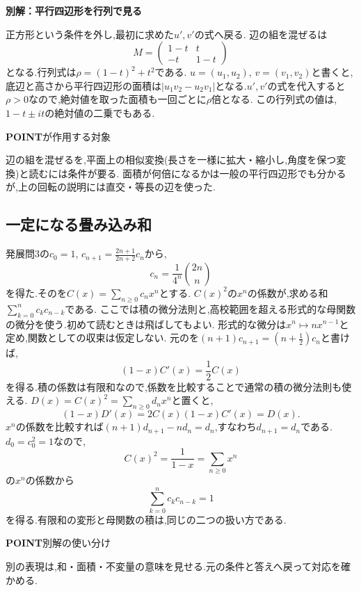 \par\medskip\noindent\textbf{別解：平行四辺形を行列で見る}\par\nobreak\smallskip
正方形という条件を外し,最初に求めた$u',v'$の式へ戻る.
辺の組を混ぜるは
\[
  M=\begin{pmatrix}1-t&t\\-t&1-t\end{pmatrix}
\]
となる.行列式は$\rho=(1-t)^2+t^2$である.
$u=(u_1,u_2)$, $v=(v_1,v_2)$と書くと,底辺と高さから平行四辺形の面積は$|u_1v_2-u_2v_1|$となる.$u',v'$の式を代入すると
\BookMathLayout{\[
    u'_1v'_2-u'_2v'_1
    =\bigl((1-t)^2+t^2\bigr)(u_1v_2-u_2v_1).
  \]}{\[
    \begin{aligned}
      u'_1v'_2-u'_2v'_1\\
      {}=\bigl((1-t)^2+t^2\bigr)(u_1v_2-u_2v_1).
    \end{aligned}
  \]}
$\rho>0$なので,絶対値を取った面積も一回ごとに$\rho$倍となる.
この行列式の値は,$1-t\pm it$の絶対値の二乗でもある.

\begin{bookpoint}
  \textbf{POINT}\quad {}が作用する対象\par
  辺の組を混ぜるを,平面上の相似変換(長さを一様に拡大・縮小し,角度を保つ変換)と読むには条件が要る.
  面積が何倍になるかは一般の平行四辺形でも分かるが,上の回転の説明には直交・等長の辺を使った.
\end{bookpoint}

\subsection{一定になる畳み込み和}
発展問3の$c_0=1$, $c_{n+1}=\frac{2n+1}{2n+2}c_n$から,
\[
  c_n=\frac1{4^n}\binom{2n}{n}
\]
を得た.そのを$C(x)=\sum_{n\ge0}c_nx^n$とする.
$C(x)^2$の$x^n$の係数が,求める和$\sum_{k=0}^n c_kc_{n-k}$である.
ここでは積の微分法則と,高校範囲を超える形式的な母関数の微分を使う.初めて読むときは飛ばしてもよい.
形式的な微分は$x^n\mapsto nx^{n-1}$と定め,関数としての収束は仮定しない.
元のを$(n+1)c_{n+1}=(n+\frac12)c_n$と書けば,
\[
  (1-x)C'(x)=\frac12C(x)
\]
を得る.積の係数は有限和なので,係数を比較することで通常の積の微分法則も使える.
$D(x)=C(x)^2=\sum_{n\ge0}d_nx^n$と置くと,
\[
  (1-x)D'(x)=2C(x)(1-x)C'(x)=D(x).
\]
$x^n$の係数を比較すれば$(n+1)d_{n+1}-nd_n=d_n$,すなわち$d_{n+1}=d_n$である.
$d_0=c_0^2=1$なので,
\[
  C(x)^2=\frac1{1-x}=\sum_{n\ge0}x^n
\]
の$x^n$の係数から
\[
  \sum_{k=0}^n c_kc_{n-k}=1
\]
を得る.有限和の変形と母関数の積は,同じの二つの扱い方である.

\begin{bookpoint}
  \textbf{POINT}\quad 別解の使い分け\par
  別の表現は,和・面積・不変量の意味を見せる.元の条件と答えへ戻って対応を確かめる.
\end{bookpoint}

